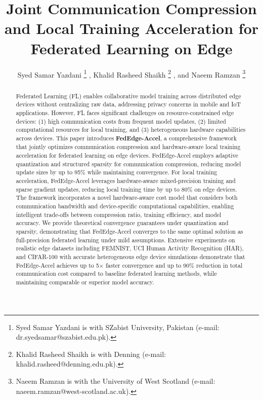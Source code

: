 \documentclass[journal]{IEEEtran}
\begin{document}
\title{Joint Communication Compression and Local Training Acceleration for Federated Learning on Edge}

\author{Syed Samar Yazdani%
\thanks{Syed Samar Yazdani is with SZabist University, Pakistan (e-mail: dr.syedsamar@szabist.edu.pk).}%
, Khalid Rasheed Shaikh%
\thanks{Khalid Rasheed Shaikh is with Denning (e-mail: khalid.rasheed@denning.edu.pk).}%
, and Naeem Ramzan%
\thanks{Naeem Ramzan is with the University of West Scotland (e-mail: naeem.ramzan@west-scotland.ac.uk).}%
}

\maketitle

\begin{abstract}
Federated Learning (FL) enables collaborative model training across distributed edge devices without centralizing raw data, addressing privacy concerns in mobile and IoT applications. However, FL faces significant challenges on resource-constrained edge devices: (1) high communication costs from frequent model updates, (2) limited computational resources for local training, and (3) heterogeneous hardware capabilities across devices. This paper introduces \textbf{FedEdge-Accel}, a comprehensive framework that jointly optimizes communication compression and hardware-aware local training acceleration for federated learning on edge devices. FedEdge-Accel employs adaptive quantization and structured sparsity for communication compression, reducing model update sizes by up to 95\% while maintaining convergence. For local training acceleration, FedEdge-Accel leverages hardware-aware mixed-precision training and sparse gradient updates, reducing local training time by up to 80\% on edge devices. The framework incorporates a novel hardware-aware cost model that considers both communication bandwidth and device-specific computational capabilities, enabling intelligent trade-offs between compression ratio, training efficiency, and model accuracy. We provide theoretical convergence guarantees under quantization and sparsity, demonstrating that FedEdge-Accel converges to the same optimal solution as full-precision federated learning under mild assumptions. Extensive experiments on realistic edge datasets including FEMNIST, UCI Human Activity Recognition (HAR), and CIFAR-100 with accurate heterogeneous edge device simulations demonstrate that FedEdge-Accel achieves up to 5$\times$ faster convergence and up to 90\% reduction in total communication cost compared to baseline federated learning methods, while maintaining comparable or superior model accuracy.
\end{abstract}
\end{document}
